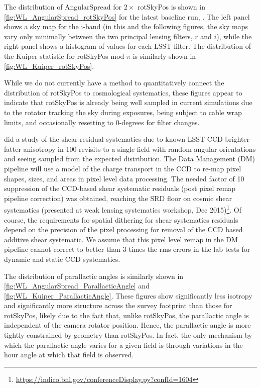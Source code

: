 The distribution of AngularSpread for $2 \times$ rotSkyPos is shown in
\autoref{fig:WL_AngularSpread_rotSkyPos} for the latest baseline \OpSim run,
.  The left panel shows a sky map for the i-band (in this and the
following figures, the sky maps vary only minimally between the two principal
lensing filters, $r$ and $i$), while the right panel shows a histogram of values
for each LSST filter.  The distribution of the Kuiper statistic for rotSkyPos
mod $\pi$ is similarly shown in \autoref{fig:WL_Kuiper_rotSkyPos}.

While we do not currently have a method to quantitatively connect the
distribution of rotSkyPos to cosmological systematics, these figures appear to
indicate that rotSkyPos is already being well sampled in current simulations due
to the rotator tracking the sky during exposures, being subject to cable wrap
limits, and occasionally resetting to 0-degrees for filter changes.

\citet{Jee&Tyson2011} did a study of the shear residual systematics due to known
LSST CCD brighter-fatter anisotropy in 100 revisits to a single field with
random angular orientations and seeing sampled from the expected distribution.
The Data Management (DM) pipeline will use a model of the charge transport in
the CCD to re-map pixel shapes, sizes, and areas in pixel level data processing.
The needed factor of 10 suppression of the CCD-based shear systematic residuals
(post pixel remap pipeline correction) was obtained, reaching the SRD floor on
cosmic shear systematics (presented at weak lensing systematics workshop, Dec
2015)\footnote{\url{https://indico.bnl.gov/conferenceDisplay.py?confId=1604}}.
Of course, the requirements for spatial dithering for shear systematics
residuals depend on the precision of the pixel processing for removal of the CCD
based additive shear systematic.  We assume that this pixel level remap in the
DM pipeline cannot correct to better than 3 times the rms errors in the lab
tests for dynamic and static CCD systematics.

The distribution of parallactic angles is similarly shown in
\autoref{fig:WL_AngularSpread_ParallacticAngle} and
\autoref{fig:WL_Kuiper_ParallacticAngle}.  These figures show significantly less
isotropy and significantly more structure across the survey footprint than those
for rotSkyPos, likely due to the fact that, unlike rotSkyPos, the parallactic
angle is independent of the camera rotator position.  Hence, the parallactic
angle is more tightly constrained by geometry than rotSkyPos.  In fact, the only
mechanism by which the parallactic angle varies for a given field is through
variations in the hour angle at which that field is observed.

